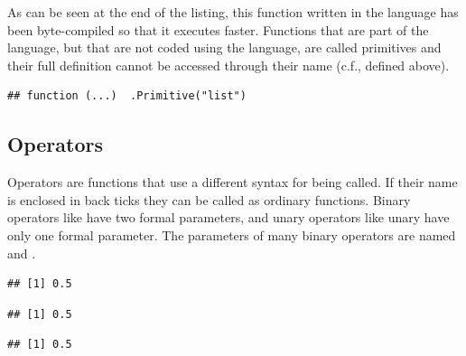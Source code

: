 \documentclass[krantz2]{krantz}\usepackage{knitr}
\begin{document}
As can be seen at the end of the listing, this function written in the \Rlang language has been byte-compiled so that it executes faster. Functions that are part of the \Rlang language, but that are not coded using the \Rlang language, are called primitives and their full definition cannot be accessed through their name (c.f.,  defined above).

\begin{knitrout}\footnotesize
{}\color{fgcolor}\begin{kframe}
\begin{alltt}
\end{alltt}
\begin{verbatim}
## function (...)  .Primitive("list")
\end{verbatim}
\end{kframe}
\end{knitrout}

\subsection{Operators}

Operators are functions that use a different syntax for being called. If their name is enclosed in back ticks they can be called as ordinary functions. Binary operators like \code{+} have two formal parameters, and unary operators like unary \code{-} have only one formal parameter. The parameters of many binary \Rlang operators are named  and .

\begin{knitrout}\footnotesize
{}\color{fgcolor}\begin{kframe}
\begin{alltt}
 \hlopt{/} 
\end{alltt}
\begin{verbatim}
## [1] 0.5
\end{verbatim}
\begin{alltt}
\hlstd{(} \hlstd{,} \hlstd{)}
\end{alltt}
\begin{verbatim}
## [1] 0.5
\end{verbatim}
\begin{alltt}
\hlstd{(} \hlstd{=}  \hlstd{,}  \hlstd{=} \hlstd{)}
\end{alltt}
\begin{verbatim}
## [1] 0.5
\end{verbatim}
\end{kframe}
\end{knitrout}
\end{document}
